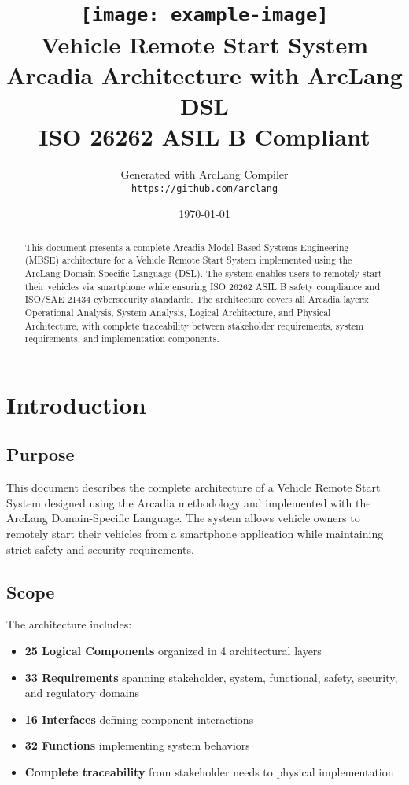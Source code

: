 \documentclass[11pt,a4paper]{article}
\title{
    \vspace{-2cm}
    \texttt{[image: example-image]} \\[1cm]
    {\Huge\bfseries Vehicle Remote Start System}\\[0.5cm]
    {\Large Arcadia Architecture with ArcLang DSL}\\[0.3cm]
    {\large ISO 26262 ASIL B Compliant}
}
\author{
    Generated with ArcLang Compiler\\
    \texttt{https://github.com/arclang}
}
\date{\today}
\begin{document}
\maketitle
\thispagestyle{empty}

\begin{abstract}
This document presents a complete Arcadia Model-Based Systems Engineering (MBSE) architecture for a Vehicle Remote Start System implemented using the ArcLang Domain-Specific Language (DSL). The system enables users to remotely start their vehicles via smartphone while ensuring ISO 26262 ASIL B safety compliance and ISO/SAE 21434 cybersecurity standards. The architecture covers all Arcadia layers: Operational Analysis, System Analysis, Logical Architecture, and Physical Architecture, with complete traceability between stakeholder requirements, system requirements, and implementation components.
\end{abstract}

\newpage
\tableofcontents
\newpage

\section{Introduction}

\subsection{Purpose}
This document describes the complete architecture of a Vehicle Remote Start System designed using the Arcadia methodology and implemented with the ArcLang Domain-Specific Language. The system allows vehicle owners to remotely start their vehicles from a smartphone application while maintaining strict safety and security requirements.

\subsection{Scope}
The architecture includes:
\begin{itemize}[leftmargin=*]
    \item \textbf{25 Logical Components} organized in 4 architectural layers
    \item \textbf{33 Requirements} spanning stakeholder, system, functional, safety, security, and regulatory domains
    \item \textbf{16 Interfaces} defining component interactions
    \item \textbf{32 Functions} implementing system behaviors
    \item \textbf{Complete traceability} from stakeholder needs to physical implementation
\end{itemize}
\end{document}
